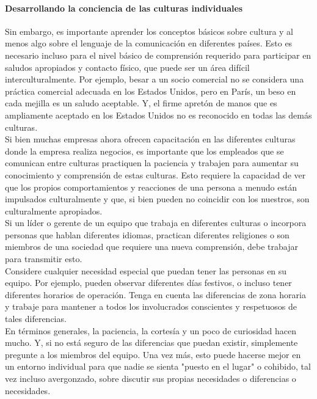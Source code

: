 \documentclass[10pt]{book}
\begin{document}
\paragraph{Desarrollando la conciencia de las culturas individuales}
Sin embargo, es importante aprender los conceptos básicos sobre cultura y al menos algo sobre el lenguaje de la comunicación en diferentes países. Esto es necesario incluso para el nivel básico de comprensión requerido para participar en saludos apropiados y contacto físico, que puede ser un área difícil interculturalmente. Por ejemplo, besar a un socio comercial no se considera una práctica comercial adecuada en los Estados Unidos, pero en París, un beso en cada mejilla es un saludo aceptable. Y, el firme apretón de manos que es ampliamente aceptado en los Estados Unidos no es reconocido en todas las demás culturas.\\
Si bien muchas empresas ahora ofrecen capacitación en las diferentes culturas donde la empresa realiza negocios, es importante que los empleados que se comunican entre culturas practiquen la paciencia y trabajen para aumentar su conocimiento y comprensión de estas culturas. Esto requiere la capacidad de ver que los propios comportamientos y reacciones de una persona a menudo están impulsados culturalmente y que, si bien pueden no coincidir con los nuestros, son culturalmente apropiados.\\
Si un líder o gerente de un equipo que trabaja en diferentes culturas o incorpora personas que hablan diferentes idiomas, practican diferentes religiones o son miembros de una sociedad que requiere una nueva comprensión, debe trabajar para transmitir esto.\\
Considere cualquier necesidad especial que puedan tener las personas en su equipo. Por ejemplo, pueden observar diferentes días festivos, o incluso tener diferentes horarios de operación. Tenga en cuenta las diferencias de zona horaria y trabaje para mantener a todos los involucrados conscientes y respetuosos de tales diferencias.\\
En términos generales, la paciencia, la cortesía y un poco de curiosidad hacen mucho. Y, si no está seguro de las diferencias que puedan existir, simplemente pregunte a los miembros del equipo. Una vez más, esto puede hacerse mejor en un entorno individual para que nadie se sienta "puesto en el lugar" o cohibido, tal vez incluso avergonzado, sobre discutir sus propias necesidades o diferencias o necesidades.\\
\end{document}
